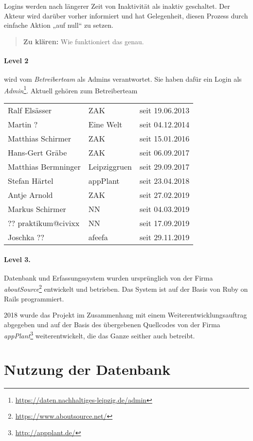 \documentclass[a4paper,11pt]{article}
\newcommand{\zuklaeren}[1]{\begin{quote} \textbf{Zu klären:} #1 \end{quote}}
\begin{document}
Logins werden nach längerer Zeit von Inaktivität als inaktiv geschaltet.  Der
Akteur wird darüber vorher informiert und hat Gelegenheit, diesen Prozess
durch einfache Aktion „auf null“ zu setzen.

\zuklaeren{Wie funktioniert das genau.}

\paragraph{Level 2}
wird vom \emph{Betreiberteam} als Admins verantwortet. Sie haben dafür ein
Login als
\emph{Admin}\footnote{\url{https://daten.nachhaltiges-leipzig.de/admin}}.
Aktuell gehören zum Betreiberteam
\begin{center}
  \begin{tabular}{llc}
    Ralf Elsässer & ZAK & seit 19.06.2013\\
    Martin ? & Eine Welt & seit 04.12.2014\\
    Matthias Schirmer & ZAK & seit 15.01.2016\\
    Hans-Gert Gräbe & ZAK & seit 06.09.2017\\
    Matthias Bermninger & Leipziggruen & seit 29.09.2017\\
    Stefan Härtel & appPlant & seit 23.04.2018\\
    Antje Arnold & ZAK & seit 27.02.2019\\
    Markus Schirmer & NN & seit 04.03.2019\\
    ?? praktikum@civixx & NN & seit 17.09.2019\\
    Joschka ?? & afeefa & seit 29.11.2019
  \end{tabular}
\end{center}
\paragraph{Level 3.}
Datenbank und Erfassungssystem wurden ursprünglich von der Firma
\emph{aboutSource}\footnote{\url{https://www.aboutsource.net/}} entwickelt und
betrieben.  Das System ist auf der Basis von Ruby on Rails programmiert. 

2018 wurde das Projekt im Zusammenhang mit einem Weiterentwicklungsauftrag
abgegeben und auf der Basis des übergebenen Quellcodes von der Firma
\emph{appPlant}\footnote{\url{http://appplant.de/}} weiterentwickelt, die das
Ganze seither auch betreibt.

\section{Nutzung der Datenbank}
\end{document}
